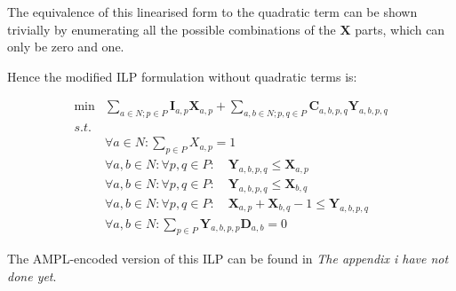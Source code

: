 The equivalence of this linearised form to the quadratic term can be shown trivially by enumerating all the possible combinations of the $\mathbf{X}$ parts, which can only be zero and one.

Hence the modified ILP formulation without quadratic terms is:

\begin{align}
	\nonumber \min & \sum_{a \in N; p \in P} \mathbf{I}_{a,p}\mathbf{X}_{a,p} + \sum_{a,b \in N; p,q \in P} \mathbf{C}_{a,b,p,q}\mathbf{Y}_{a,b,p,q} \\
	\nonumber s.t. &  \\
	\nonumber & \forall a \in N : \sum_{p \in P}X_{a,p} = 1 \\
	\nonumber & \forall a,b \in N : \forall p,q \in P : \quad \mathbf{Y}_{a,b,p,q} \leq \mathbf{X}_{a,p} \\
	\nonumber & \forall a,b \in N : \forall p,q \in P : \quad \mathbf{Y}_{a,b,p,q} \leq \mathbf{X}_{b,q} \\
	\nonumber & \forall a,b \in N : \forall p,q \in P : \quad \mathbf{X}_{a,p} + \mathbf{X}_{b,q} - 1 \leq \mathbf{Y}_{a,b,p,q} \\
	\nonumber & \forall a,b \in N : \sum_{p \in P}\mathbf{Y}_{a,b,p,p}\mathbf{D}_{a,b} = 0
\end{align}

The AMPL-encoded version of this ILP can be found in {\em The appendix i have not done yet}.%
